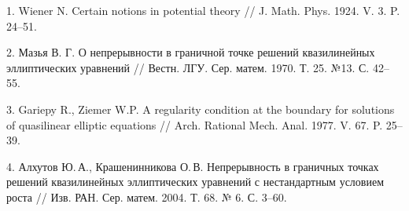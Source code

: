 \litlist

1. Wiener N. Certain notions in potential theory // J. Math. Phys. 1924. V. 3. P. 24--51.


2. Мазья В. Г. О непрерывности в граничной точке решений квазилинейных эллиптических
уравнений // Вестн. ЛГУ. Сер. матем. 1970. Т. 25. №13. С. 42--55.


3. Gariepy R., Ziemer W.P. A regularity condition at the boundary for solutions of quasilinear
elliptic equations // Arch. Rational Mech. Anal. 1977. V. 67. P. 25--39.


4. Алхутов Ю.\,А., Крашенинникова О.\,В.
Непрерывность в граничных точках решений квазилинейных эл\-ли\-п\-ти\-че\-с\-ких уравнений с нестандартным условием роста
//
Изв.
\linebreak
РАН. Сер. матем. 2004. Т. 68. № 6. С. 3–60.
